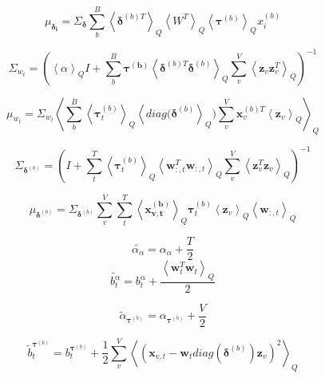 \documentclass[10pt]{article}
\newcommand{\Angle}[1]{\left \langle #1 \right \rangle}
\newcommand{\Eq}[1]{\Angle{#1}_Q}
\begin{document}
    \begin{equation}
        \mu_{\bm{\delta_i}} = \Sigma_{\bm{\delta}}\sum_b^B\Eq{\bm{\delta}^{(b)T}}\Eq{W^T}\Eq{\bm{\tau}^{(b)}}x^{(b)}_i
    \end{equation}

    \begin{equation}
        \Sigma_{w_t} = (\Eq{\alpha}I + \sum_b^B\bm{\tau^{(b)}}\Eq{\bm{\delta}^{(b)T}\bm{\delta}^{(b)}}\sum_v^V\Eq{\bm{z}_v\bm{z}_v^T})^{-1}
    \end{equation}

    \begin{equation}
        \mu_{w_t} = \Sigma_{w_t}\Eq{\sum_b^B\Eq{\bm{\tau}_t^{(b)}}\Eq{diag(\bm{\delta}^{(b)}})\sum_v^V \bm{x}_v^{(b)T}\Eq{\bm{z}_v} }
    \end{equation}

    \begin{equation}
        \Sigma_{\bm{\delta}^{(b)}} = (I + \sum_t^T\Eq{\bm{\tau}_t^{(b)}}\Eq{\bm{w}_{:,t}^T\bm{w}_{:,t}}\sum_v^V\Eq{\bm{z}_v^T\bm{z}_v})^{-1}
    \end{equation}

    \begin{equation}
        \mu_{\bm{\delta}^{(b)}}=\Sigma_{\bm{\delta}^{(b)}}\sum_v^V\sum_t^T\Eq{\bm{x_{v,t}^{(b)}}}\bm{\tau}^{(b)}_t\Eq{\bm{z}_v}\Eq{\bm{w}_{:,t}}
    \end{equation}

    \begin{equation}
        \tilde{\alpha_{\alpha}} = \alpha_{\alpha} + \frac{T}{2}
    \end{equation}
    \begin{equation}
        \tilde{b^{\alpha}_t} = b^{\alpha}_t + \frac{\Eq{\bm{w}_t^T\bm{w}_t}}{2}
    \end{equation}

    \begin{equation}
        \tilde{\alpha}_{\bm{\tau}^{(b)}} = \alpha_{\bm{\tau}^{(b)}} + \frac{V}{2}
    \end{equation}

    \begin{equation}
        \tilde{b}_t^{\bm{\tau}^{(b)}} = b_t^{\bm{\tau}^{(b)}} + \frac{1}{2}\sum_v^V\Eq{(\bm{x}_{v,t} - \bm{w}_tdiag(\bm{\delta}^{(b)})\bm{z}_v)^2}
    \end{equation}
\end{document}
